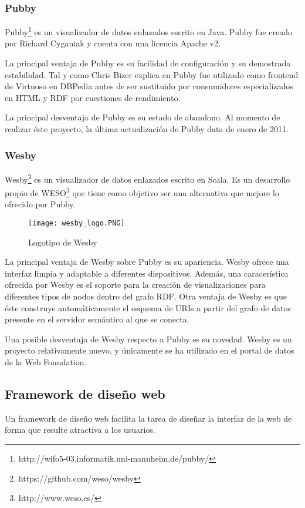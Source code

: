 \subsubsection{Pubby}
Pubby\footnote{http://wifo5-03.informatik.uni-mannheim.de/pubby/} es un visualizador de datos enlazados escrito en Java.  Pubby fue creado por Richard Cyganiak y cuenta con una licencia Apache v2.

La principal ventaja de Pubby es su facilidad de configuración y su demostrada estabilidad. Tal y como Chris Bizer explica en  Pubby fue utilizado como frontend de Virtuoso en DBPedia antes de ser sustituido por consumidores especializados en HTML y RDF por cuestiones de rendimiento.

La principal desventaja de Pubby es su estado de abandono. Al momento de realizar éste proyecto, la última actualización de Pubby data de enero de 2011.

\subsubsection{Wesby}
Wesby\footnote{https://github.com/weso/wesby} es un visualizador de datos enlazados escrito en Scala. Es un desarrollo propio de WESO\footnote{http://www.weso.es/} que tiene como objetivo ser una alternativa que mejore lo ofrecido por Pubby.

\begin{figure}[h]
\centering
\texttt{[image: wesby\_logo.PNG]}
\caption{Logotipo de Wesby}
\end{figure}

La principal ventaja de Wesby sobre Pubby es su apariencia. Wesby ofrece una interfaz limpia y adaptable a diferentes dispositivos. Además, una caracerística ofrecida por Wesby es el soporte para la creación de visualizaciones para diferentes tipos de nodos dentro del grafo RDF. Otra ventaja de Wesby es que éste construye automáticamente el esquema de URIs a partir del grafo de datos presente en el servidor semántico al que se conecta.

Una posible desventaja de Wesby respecto a Pubby es su novedad. Wesby es un proyecto relativamente nuevo, y únicamente se ha utilizado en el portal de datos de la Web Foundation.



\subsection{Framework de diseño web}
Un framework de diseño web facilita la tarea de diseñar la interfaz de la web de forma que resulte atractiva a los usuarios.


